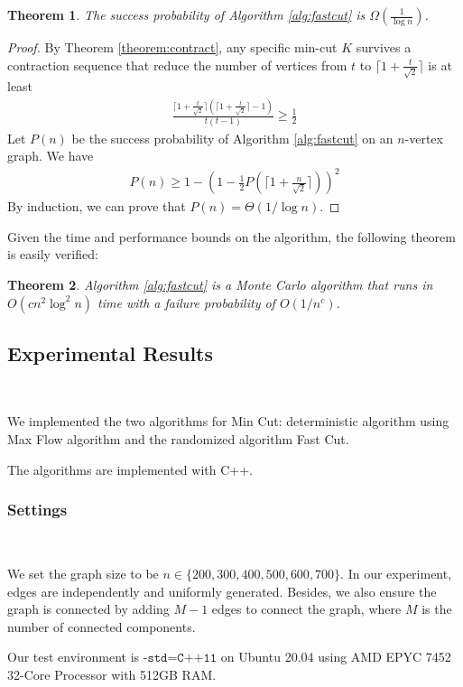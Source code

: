 \documentclass[11pt]{article}
\theoremstyle{plain}
\newtheorem{theorem}{Theorem}[section]
\begin{document}
\begin{theorem}
    The success probability of Algorithm \ref{alg:fastcut} is $\Omega(\frac{1}{\log n})$.
\end{theorem}
\begin{proof}
    By Theorem \ref{theorem:contract}, any specific min-cut $K$ survives a contraction sequence that reduce the number of vertices from $t$ to $\lceil 1+\frac{t}{\sqrt{2}}\rceil$ is at least
    \begin{align*}
        \frac{\lceil 1+\frac{t}{\sqrt{2}}\rceil(\lceil 1+\frac{t}{\sqrt{2}}\rceil-1)}{t(t-1)}\geq \frac{1}{2}
    \end{align*}
    Let $P(n)$ be the success probability of Algorithm \ref{alg:fastcut} on an $n$-vertex graph. We have
    \begin{align*}
        P(n)\geq 1-\left(1-\frac{1}{2}P\left(\lceil 1+\frac{n}{\sqrt{2}}\rceil\right)\right)^2
    \end{align*}
    By induction, we can prove that $P(n)=\Theta(1/\log n)$.
\end{proof}
Given the time and performance bounds on the algorithm, the following theorem is easily verified:

\begin{theorem}
    Algorithm \ref{alg:fastcut} is a Monte Carlo algorithm that runs in $O(cn^2\log^2 n)$ time with a failure probability of $O(1/n^c)$.
\end{theorem}

\subsection{Experimental Results}\

We implemented the two algorithms for Min Cut: deterministic algorithm using Max Flow algorithm and the randomized algorithm Fast Cut.

The algorithms are implemented with C++.

\subsubsection{Settings}\

We set the graph size to be $n\in\{200,300,400,500,600,700\}$. In our experiment, edges are independently and uniformly generated. Besides, we also ensure the graph is connected by adding $M-1$ edges to connect the graph, where $M$ is the number of connected components.

Our test environment is $\texttt{-std=C++11}$ on Ubuntu 20.04 using AMD EPYC 7452 32-Core Processor with 512GB RAM.
\end{document}
